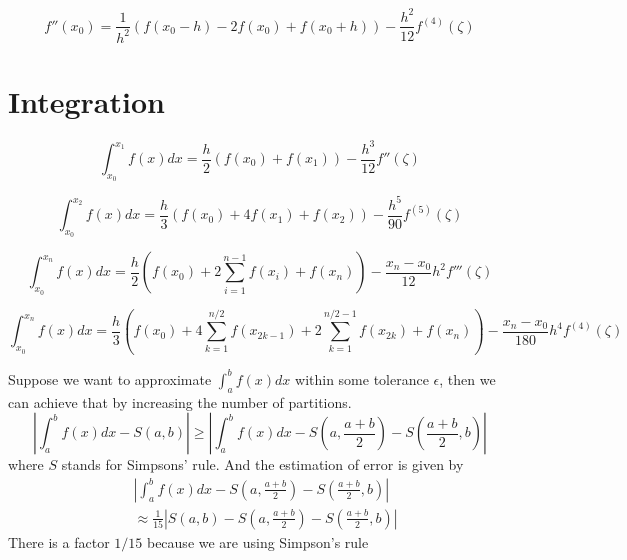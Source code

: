 \begin{thm} 
\[ f''(x_0) = \frac{1}{h^2} (f(x_0-h) - 2f(x_0) + f(x_0+h) )- \frac{h^2}{12} f^{(4)}(\zeta)\]
\end{thm}


\section{Integration}
\begin{thm} 
	\[\int_{x_0}^{x_1} f(x)dx = \frac{h}{2} (f(x_0) + f(x_1)) - \frac{h^3}{12} f''(\zeta)\]
\end{thm}

\begin{thm} 
	\[\int_{x_0}^{x_2} f(x)dx = \frac{h}{3} (f(x_0) + 4f(x_1) + f(x_2))- \frac{h^5}{90} f^{(5)}(\zeta)\]
\end{thm}

\begin{thm} 
\[ \int_{x_0}^{x_n} f(x)dx = \frac{h}{2}\left ( f(x_0) + 2\sum_{i=1}^{n-1}f(x_i) + f(x_n) \right ) - \frac{x_n-x_0}{12}h^2 f'''(\zeta)\]
\end{thm}

\begin{thm} 
	\[ \int_{x_0}^{x_n} f(x)dx = \frac{h}{3}\left ( f(x_0) + 4\sum_{k=1}^{n/2}f(x_{2k-1}) + 2\sum_{k=1}^{n/2-1}f(x_{2k}) +f(x_n) \right ) - \frac{x_n-x_0}{180}h^4f^{(4)}(\zeta) \]
\end{thm}

\begin{thm} 
	Suppose we want to approximate $\int_a^b f(x)dx$ within some tolerance $\epsilon$, then we can achieve that by increasing the number of partitions.
	\[\left|\int_a^bf(x)dx - S(a,b)\right|
	\geq \left|\int_a^bf(x)dx - S\left(a,\frac{a+b}{2}\right) - S\left(\frac{a+b}{2}, b\right)\right| \]
	where $S$ stands for Simpsons' rule. And the estimation of error is given by
	\begin{align*}
	&\left|\int_a^bf(x)dx - S\left(a,\frac{a+b}{2}\right) - S\left(\frac{a+b}{2}, b\right) \right|\\ 
	&\approx 
	\frac{1}{15}\left|S(a,b) - S\left(a,\frac{a+b}{2}\right) - S\left(\frac{a+b}{2}, b\right)\right|
	\end{align*}
	There is a factor $1/15$ because we are using Simpson's rule
\end{thm}

